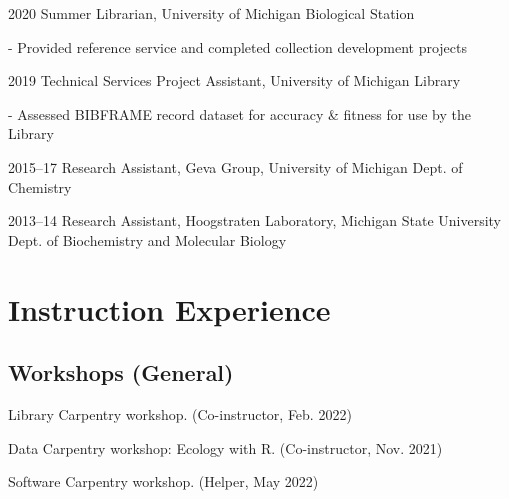 \documentclass[12pt,letterpaper]{report}
\newcommand{\listitemspace}{0.25em}
\renewenvironment{itemize}
{\begin{list}{}{\setlength{\leftmargin}{0em}
            \setlength{\parskip}{0em}
            \setlength{\itemsep}{\listitemspace}
            \setlength{\parsep}{\listitemspace}}}
{\end{list}}
\begin{document}
\begin{tablist}
	\item[2020] \tab Summer Librarian, University of Michigan Biological Station

	\begin{itemize} \begin{footnotesize}

		\item - Provided reference service and completed collection development projects

	\end{footnotesize} \end{itemize}
    
	\item[2019] \tab Technical Services Project Assistant, University of Michigan Library
	
	\begin{itemize} \begin{footnotesize}
	
		\item - Assessed BIBFRAME record dataset for accuracy \& fitness for use by the Library
		
	\end{footnotesize} \end{itemize}

	\item[2015--17] \tab Research Assistant, Geva Group, University of Michigan Dept. of Chemistry
	
	\item[2013--14] \tab Research Assistant, Hoogstraten Laboratory, Michigan State University Dept. of Biochemistry and Molecular Biology

\end{tablist}



\section*{Instruction Experience}

\subsection*{Workshops (General)}

\begin{itemize}

	\item Library Carpentry workshop. (Co-instructor, Feb. 2022)
	
	\item Data Carpentry workshop: Ecology with R. (Co-instructor, Nov. 2021)
	
	\item Software Carpentry workshop. (Helper, May 2022)

\end{itemize}
\end{document}
